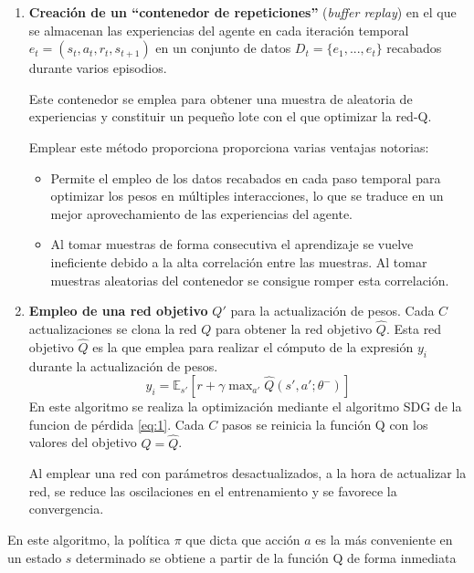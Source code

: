 \begin{enumerate}
	\item \textbf{Creación de un ``contenedor de repeticiones''} (\textit{buffer replay}) en el que se almacenan las experiencias del agente en cada iteración temporal $e_t=(s_t,a_t,r_t,s_{t+1})$ en un conjunto de datos $D_t=\{e_1,...,e_t\}$ recabados durante varios episodios.
	
	Este contenedor se emplea para obtener una muestra de aleatoria de experiencias y constituir un pequeño lote con el que optimizar la red-Q.
	
	Emplear este método proporciona proporciona varias ventajas notorias:
	
	\begin{itemize}
		\item Permite el empleo de los datos recabados en cada paso temporal para optimizar los pesos en múltiples interacciones, lo que se traduce en un mejor aprovechamiento de las experiencias del agente.
		
		\item Al tomar muestras de forma consecutiva el aprendizaje se vuelve ineficiente debido a la alta correlación entre las muestras. Al tomar muestras aleatorias del contenedor se consigue romper esta correlación.
	\end{itemize}
	
	\item \textbf{Empleo de una red objetivo }$Q'$ para la actualización de pesos.  Cada $C$ actualizaciones se clona la red $Q$ para obtener la red objetivo $\hat Q$. Esta red objetivo $\hat Q$ es la que emplea para realizar el cómputo de la expresión $y_i$ durante la actualización de pesos.
	\begin{equation}
	y_i= \mathbb{E}_{s'}[ r + \gamma \; {\text{max}_{a'}} \; \hat Q(s',a';\theta^-)]
	\end{equation}
	En este algoritmo se realiza la optimización mediante el algoritmo SDG de la funcion de pérdida \ref{eq:1}.  Cada $C$ pasos se reinicia la función Q con los valores del objetivo $Q=\hat Q$.
	
	Al emplear una red con parámetros desactualizados, a la hora de actualizar la red, se  reduce las oscilaciones en el entrenamiento y se favorece la convergencia.
	
\end{enumerate}

En este algoritmo, la política $\pi$ que dicta que acción $a$ es la más conveniente en un estado $s$ determinado se obtiene a partir de la función Q de forma inmediata

